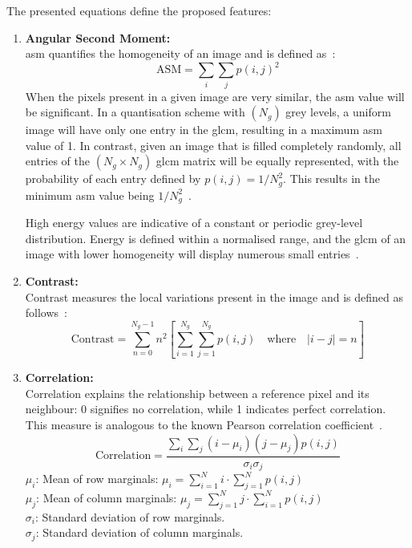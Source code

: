 The presented equations define the proposed features:
\begin{enumerate}
\newcommand{\tightitem}[1]{\begin{samepage}\item #1\end{samepage}}
    \item \textbf{Angular Second Moment:}\\
    \acf{asm} quantifies the homogeneity of an image and is defined as~\cite {haralick_textural_1973}:
        \begin{equation}
            \text{ASM} = \sum_{i} \sum_{j} p(i,j)^2
        \end{equation}
    When the pixels present in a given image are very similar, the \ac{asm} value will be significant. In a quantisation scheme with $(N_g)$ grey levels, a uniform image will have only one entry in the \ac{glcm}, resulting in a maximum \ac{asm} value of 1. In contrast, given an image that is filled completely randomly, all entries of the $(N_g \times N_g)$ \ac{glcm} matrix will be equally represented, with the probability of each entry defined by $p(i, j) = {1}/{N_g^2}$.
    This results in the minimum \ac{asm} value being ${1}/{N_g^2}$~\cite{oprisan_bounds_2023}.

    High energy values are indicative of a constant or periodic grey-level distribution. Energy is defined within a normalised range, and the \ac{glcm} of an image with lower homogeneity will display numerous small entries~\cite{oprisan_bounds_2023}.
    
    \item \textbf{Contrast:}\\
    Contrast measures the local variations present in the image and is defined as follows~\cite {haralick_textural_1973}:
        \begin{equation}
            \text{Contrast} = \sum_{n=0}^{N_g - 1} n^2 \left[ \sum_{i=1}^{N_g} \sum_{j=1}^{N_g} p(i,j) \quad \text{where} \quad |i - j| = n \right]
        \end{equation}
        
    \item \textbf{Correlation:}\\
    Correlation explains the relationship between a reference pixel and its neighbour: 0 signifies no correlation, while 1 indicates perfect correlation. This measure is analogous to the known Pearson correlation coefficient~\cite{oprisan_bounds_2023}.
        \begin{equation}
            \text{Correlation} = \frac{\sum_{i} \sum_{j} (i - \mu_i)(j - \mu_j) p(i,j)}{\sigma_i \sigma_j}
        \end{equation}
    $\mu_i$: Mean of row marginals: $\mu_i = \sum_{i=1}^{N} i \cdot \sum_{j=1}^{N} p(i,j)$ \\
    $\mu_j$: Mean of column marginals: $\mu_j = \sum_{j=1}^{N} j \cdot \sum_{i=1}^{N} p(i,j)$ \\
    $\sigma_i$: Standard deviation of row marginals. \\
    $\sigma_j$: Standard deviation of column marginals.\\
        

\end{enumerate}
